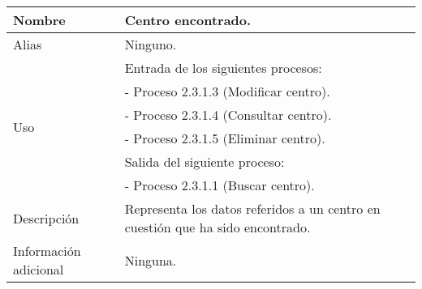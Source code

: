 \begin{center}
  \begin{tabular}{| l | p{9cm} |}
    \hline
    Nombre & \textbf{Centro encontrado}.\\
    \hline
    Alias & Ninguno.\\
    \hline
    \multirow{6}{*}{Uso} & Entrada de los siguientes procesos:\\
                         & - Proceso 2.3.1.3 (Modificar centro).\\
                         & - Proceso 2.3.1.4 (Consultar centro).\\
                         & - Proceso 2.3.1.5 (Eliminar centro).\\
                         & Salida del siguiente proceso:\\
                         & - Proceso 2.3.1.1 (Buscar centro).\\
    \hline
    Descripción & Representa los datos referidos a un centro en cuestión que ha
                  sido encontrado.\\
    \hline
    Información adicional & Ninguna.\\
    \hline
  \end{tabular}
\end{center}
